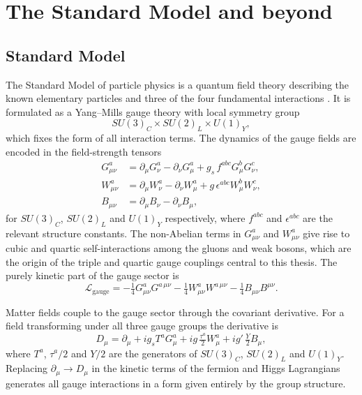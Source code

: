 \chapter{The Standard Model and beyond}
\label{chap:sm}

\section{Standard Model}

The Standard Model of particle physics is a quantum field theory describing the known elementary particles and three of the four fundamental interactions \cite{Thomson_ModernParticlePhysics_2013, Griffiths_IntroParticles_2008}. It is formulated as a Yang--Mills gauge theory \cite{YangMills_Symmetry_1954} with local symmetry group
\begin{equation}
SU(3)_{C}\times SU(2)_{L}\times U(1)_{Y},
\end{equation}
which fixes the form of all interaction terms. The dynamics of the gauge fields are encoded in the field-strength tensors
\begin{align}
G_{\mu\nu}^{a} &= \partial_{\mu}G_{\nu}^{a} - \partial_{\nu}G_{\mu}^{a} + g_{s}\,f^{abc}G_{\mu}^{b}G_{\nu}^{c}, \\ W_{\mu\nu}^{a} &= \partial_{\mu}W_{\nu}^{a} - \partial_{\nu}W_{\mu}^{a} + g\,\epsilon^{abc}W_{\mu}^{b}W_{\nu}^{c}, \\ B_{\mu\nu} &= \partial_{\mu}B_{\nu} - \partial_{\nu}B_{\mu},
\end{align}
for $SU(3)_{C}$, $SU(2)_{L}$ and $U(1)_{Y}$ respectively, where $f^{abc}$ and $\epsilon^{abc}$ are the relevant structure constants. The non-Abelian terms in $G_{\mu\nu}^{a}$ and $W_{\mu\nu}^{a}$ give rise to cubic and quartic self-interactions among the gluons and weak bosons, which are the origin of the triple and quartic gauge couplings central to this thesis. The purely kinetic part of the gauge sector is
\begin{equation}
\mathcal{L}_{\mathrm{gauge}} = -\tfrac{1}{4}G_{\mu\nu}^{a}G^{a\,\mu\nu} -\tfrac{1}{4}W_{\mu\nu}^{a}W^{a\,\mu\nu} -\tfrac{1}{4}B_{\mu\nu}B^{\mu\nu}.
\end{equation}

Matter fields couple to the gauge sector through the covariant derivative. For a field transforming under all three gauge groups the derivative is
\begin{equation}
D_{\mu} = \partial_{\mu} + ig_{s}T^{a}G_{\mu}^{a} + ig\,\tfrac{\tau^{a}}{2}W_{\mu}^{a} + ig'\,\tfrac{Y}{2}B_{\mu},
\label{eq:covderiv}
\end{equation}
where $T^{a}$, $\tau^{a}/2$ and $Y/2$ are the generators of $SU(3)_{C}$, $SU(2)_{L}$ and $U(1)_{Y}$. Replacing $\partial_{\mu}\to D_{\mu}$ in the kinetic terms of the fermion and Higgs Lagrangians generates all gauge interactions in a form given entirely by the group structure.

